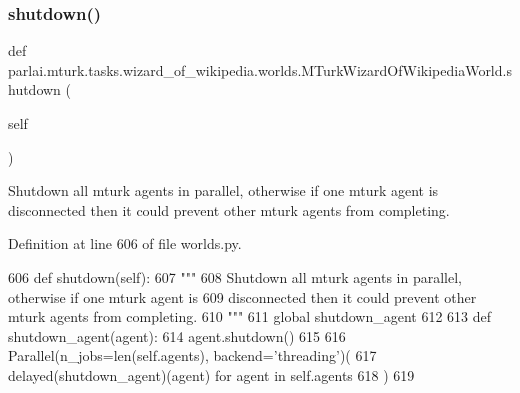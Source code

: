 \subsubsection{\texorpdfstring{shutdown()}{shutdown()}}
{\footnotesize\ttfamily def parlai.\+mturk.\+tasks.\+wizard\+\_\+of\+\_\+wikipedia.\+worlds.\+M\+Turk\+Wizard\+Of\+Wikipedia\+World.\+shutdown (\begin{DoxyParamCaption}\item[{}]{self }\end{DoxyParamCaption})}

\begin{DoxyVerb}Shutdown all mturk agents in parallel, otherwise if one mturk agent is
disconnected then it could prevent other mturk agents from completing.
\end{DoxyVerb}
 

Definition at line 606 of file worlds.\+py.


\begin{DoxyCode}
606     \textcolor{keyword}{def }shutdown(self):
607         \textcolor{stringliteral}{"""}
608 \textcolor{stringliteral}{        Shutdown all mturk agents in parallel, otherwise if one mturk agent is}
609 \textcolor{stringliteral}{        disconnected then it could prevent other mturk agents from completing.}
610 \textcolor{stringliteral}{        """}
611         \textcolor{keyword}{global} shutdown\_agent
612 
613         \textcolor{keyword}{def }shutdown\_agent(agent):
614             agent.shutdown()
615 
616         Parallel(n\_jobs=len(self.agents), backend=\textcolor{stringliteral}{'threading'})(
617             delayed(shutdown\_agent)(agent) \textcolor{keywordflow}{for} agent \textcolor{keywordflow}{in} self.agents
618         )
619 \end{DoxyCode}
\mbox{\label{classparlai_1_1mturk_1_1tasks_1_1wizard__of__wikipedia_1_1worlds_1_1MTurkWizardOfWikipediaWorld_ac5774d235722eef3721845e5cc4ad588}} 
